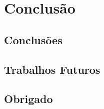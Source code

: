 \section{Conclusão}

\subsection{Conclusões}
    \begin{frame}\frametitle{}
    \end{frame}
    
\subsection{Trabalhos Futuros}
    \begin{frame}\frametitle{}
    \end{frame}
    
\subsection{Obrigado}
    \begin{frame}\frametitle{}
    \end{frame}
